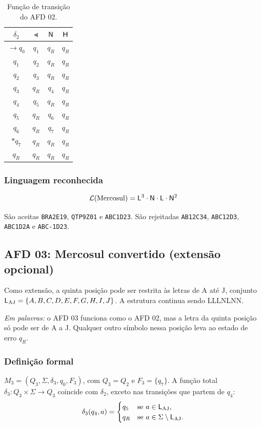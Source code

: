 \begin{table}[ht]
\centering
\begin{tabular}{cccc}
\toprule
$\delta_2$ & $\Lt$ & $\mathsf{N}$ & $\mathsf{H}$ \\
\midrule
$\to q_0$ & $q_1$ & $q_R$ & $q_R$ \\
$q_1$     & $q_2$ & $q_R$ & $q_R$ \\
$q_2$     & $q_3$ & $q_R$ & $q_R$ \\
$q_3$     & $q_R$ & $q_4$ & $q_R$ \\
$q_4$     & $q_5$ & $q_R$ & $q_R$ \\
$q_5$     & $q_R$ & $q_6$ & $q_R$ \\
$q_6$     & $q_R$ & $q_7$ & $q_R$ \\
$* q_7$   & $q_R$ & $q_R$ & $q_R$ \\
$q_R$     & $q_R$ & $q_R$ & $q_R$ \\
\bottomrule
\end{tabular}
\caption{Função de transição do AFD 02.}
\label{tab:delta2}
\end{table}

\subsubsection{Linguagem reconhecida}

\[
  \mathcal{L}(\mathrm{Mercosul}) = \mathsf{L}^3 \cdot \mathsf{N} \cdot \mathsf{L} \cdot \mathsf{N}^2
\]

São aceitas \texttt{BRA2E19}, \texttt{QTP9Z01} e \texttt{ABC1D23}.
São rejeitadas \texttt{AB12C34}, \texttt{ABC12D3}, \texttt{ABC1D2A}
e \texttt{ABC-1D23}.

\subsection{AFD 03: Mercosul convertido (extensão opcional)}

Como extensão, a quinta posição pode ser restrita às letras de A
até J, conjunto $\mathsf{L}_{\mathrm{AJ}} = \{A, B, C, D, E, F, G, H, I, J\}$. A
estrutura continua sendo LLLNLNN.

\emph{Em palavras:} o AFD 03 funciona como o AFD 02, mas a letra da
quinta posição só pode ser de A a J. Qualquer outro símbolo nessa
posição leva ao estado de erro $q_R$.

\subsubsection{Definição formal}

$M_3 = (Q_3, \Sigma, \delta_3, q_0, F_3)$, com $Q_3 = Q_2$ e
$F_3 = \{q_7\}$. A função total $\delta_3 : Q_3 \times \Sigma \to Q_3$
coincide com $\delta_2$, exceto nas transições que partem de $q_4$:
\[
  \delta_3(q_4, a) =
  \begin{cases}
    q_5 & \text{se } a \in \mathsf{L}_{\mathrm{AJ}},\\
    q_R & \text{se } a \in \Sigma \setminus \mathsf{L}_{\mathrm{AJ}}.
  \end{cases}
\]

